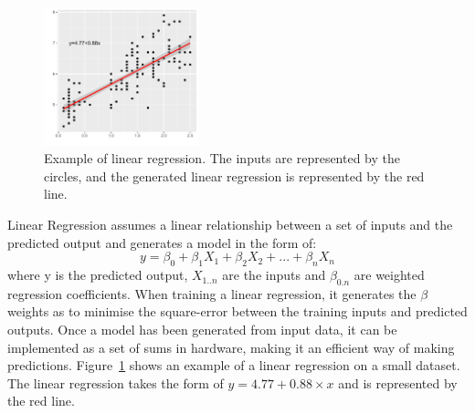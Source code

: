 \begin{figure}[t]
    \centering
    \includegraphics[width=0.40\textwidth]{background/graphics/lin_reg_ex.pdf}
	\vspace{-1em}
    \caption{Example of linear regression. The inputs are represented by the circles, and the generated linear regression is represented by the red line.}
    \label{fig:linregex}
	\vspace{-1em}
\end{figure}

Linear Regression assumes a linear relationship between a set of inputs and the predicted output and generates a model in the form of:
\begin{equation}
y = \beta_0 + \beta_1X_1 + \beta_2X_2 + ... + \beta_nX_n
\end{equation}
where y is the predicted output, $X_{1..n}$ are the inputs and $\beta_{0.n}$ are weighted regression coefficients.
When training a linear regression, it generates the $\beta$ weights as to minimise the square-error between the training inputs and predicted outputs.
Once a model has been generated from input data, it can be implemented as a set of sums in hardware, making it an efficient way of making predictions.
Figure~\ref{fig:linregex} shows an example of a linear regression on a small dataset.
The linear regression takes the form of $y=4.77 + 0.88 \times x$ and is represented by the red line.


